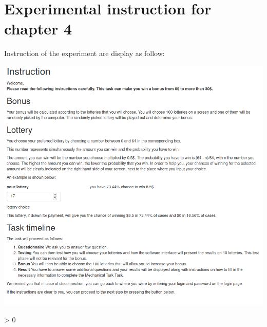 \documentclass[
]{book}
\newlength{\cslhangindent}
\newenvironment{CSLReferences}[2] %
 {%
  \setlength{\parindent}{0pt}
  \ifodd #1 \everypar{\setlength{\hangindent}{\cslhangindent}}\ignorespaces\fi
  \ifnum #2 > 0
  \setlength{\parskip}{#2\baselineskip}
  \fi
 }%
 {}
\begin{document}
\hypertarget{expe-instruc4}{%
\chapter{Experimental instruction for chapter 4}\label{expe-instruc4}}

Instruction of the experiment are display as follow:

\includegraphics[width=0.9\linewidth,height=1.2\textheight]{annexe_file/consigne_c4}

\hypertarget{refs}{}
\begin{CSLReferences}{0}{0}
\end{CSLReferences}

  
\end{document}
